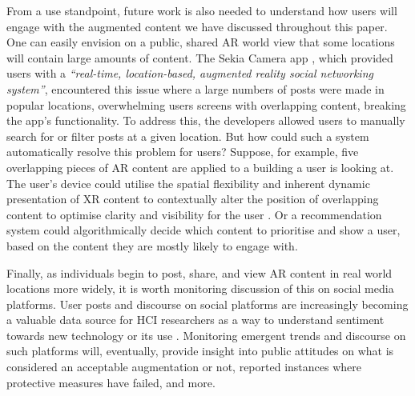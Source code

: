 From a use standpoint, future work is also needed to understand how users will engage with the augmented content we have discussed throughout this paper. 
One can easily envision on a public, shared AR world view that some locations will contain large amounts of content. 
The Sekia Camera app \cite{lit_9}, which provided users with a \textit{``real-time, location-based, augmented reality social networking system''}, encountered this issue where a large numbers of posts were made in popular locations, overwhelming users screens with overlapping content, breaking the app's functionality. 
To address this, the developers allowed users to manually search for or filter posts at a given location. 
But how could such a system automatically resolve this problem for users? 
Suppose, for example, five overlapping pieces of AR content are applied to a building a user is looking at. 
The user's device could utilise the spatial flexibility \cite{hyunsung-minexr, o2023dynamic, chi-joseph} and inherent dynamic presentation \cite{imx-joseph, avi-joseph,  bystander-perdis-joseph, shady-bans, julie, ismar-stories} of XR content to contextually alter the position of overlapping content to optimise clarity and visibility for the user \cite{reality-aware, ieee-hyunsung}. 
Or a recommendation system could algorithmically decide which content to prioritise and show a user, based on the content they are mostly likely to engage with.

Finally, as individuals begin to post, share, and view AR content in real world locations more widely, it is worth monitoring discussion of this on social media platforms. 
User posts and discourse on social platforms are increasingly becoming a valuable data source for HCI researchers \cite{singh2024exploring, user-reviews, subreddit-addition-recovery-gauthier, ux-subreddit-shukla} as a way to understand sentiment towards new technology \cite{li2023sentiment} or its use \cite{ux-subreddit-shukla}. 
Monitoring emergent trends and discourse on such platforms will, eventually, provide insight into public attitudes on what is considered an acceptable augmentation or not, reported instances where protective measures have failed, and more.